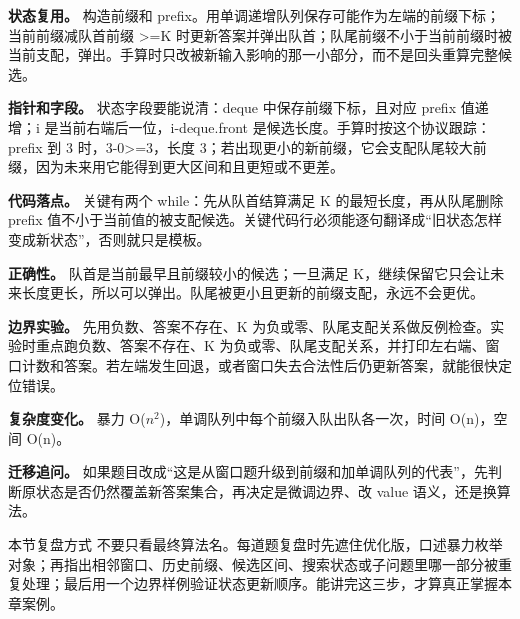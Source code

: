 \textbf{状态复用。} 构造前缀和 prefix。用单调递增队列保存可能作为左端的前缀下标；当前前缀减队首前缀 >=K 时更新答案并弹出队首；队尾前缀不小于当前前缀时被当前支配，弹出。手算时只改被新输入影响的那一小部分，而不是回头重算完整候选。

\textbf{指针和字段。} 状态字段要能说清：deque 中保存前缀下标，且对应 prefix 值递增；i 是当前右端后一位，i-deque.front 是候选长度。手算时按这个协议跟踪：prefix 到 3 时，3-0>=3，长度 3；若出现更小的新前缀，它会支配队尾较大前缀，因为未来用它能得到更大区间和且更短或不更差。

\textbf{代码落点。} 关键有两个 while：先从队首结算满足 K 的最短长度，再从队尾删除 prefix 值不小于当前值的被支配候选。关键代码行必须能逐句翻译成“旧状态怎样变成新状态”，否则就只是模板。

\textbf{正确性。} 队首是当前最早且前缀较小的候选；一旦满足 K，继续保留它只会让未来长度更长，所以可以弹出。队尾被更小且更新的前缀支配，永远不会更优。

\textbf{边界实验。} 先用负数、答案不存在、K 为负或零、队尾支配关系做反例检查。实验时重点跑负数、答案不存在、K 为负或零、队尾支配关系，并打印左右端、窗口计数和答案。若左端发生回退，或者窗口失去合法性后仍更新答案，就能很快定位错误。

\textbf{复杂度变化。} 暴力 O(\ensuremath{n^{2}})，单调队列中每个前缀入队出队各一次，时间 O(n)，空间 O(n)。

\textbf{迁移追问。} 如果题目改成“这是从窗口题升级到前缀和加单调队列的代表”，先判断原状态是否仍然覆盖新答案集合，再决定是微调边界、改 value 语义，还是换算法。

\begin{principlebox}{本节复盘方式}
不要只看最终算法名。每道题复盘时先遮住优化版，口述暴力枚举对象；再指出相邻窗口、历史前缀、候选区间、搜索状态或子问题里哪一部分被重复处理；最后用一个边界样例验证状态更新顺序。能讲完这三步，才算真正掌握本章案例。
\end{principlebox}
